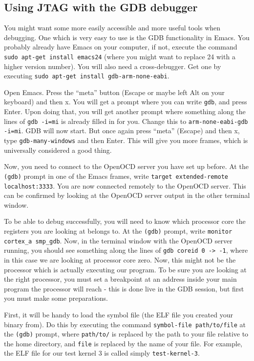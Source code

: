 \documentclass[a4paper,11pt,reqno]{amsart}
\begin{document}
{\subsection{Using JTAG with the GDB debugger}
You might want some more easily accessible and more useful tools when debugging. One which is very easy to use is the GDB functionality in Emacs. You probably already have Emacs on your computer, if not, execute the command \texttt{sudo apt-get install emacs24} (where you might want to replace 24 with a higher version number). You will also need a cross-debugger. Get one by executing \texttt{sudo apt-get install gdb-arm-none-eabi}.

Open Emacs. Press the ``meta'' button (Escape or maybe left Alt on your keyboard) and then x. You will get a prompt where you can write \texttt{gdb}, and press Enter. Upon doing that, you will get another prompt where something along the lines of \texttt{gdb -i=mi} is already filled in for you. Change this to \texttt{arm-none-eabi-gdb -i=mi}. GDB will now start. But once again press ``meta'' (Escape) and then x, type \texttt{gdb-many-windows} and then Enter. This will give you more frames, which is universally considered a good thing.

Now, you need to connect to the OpenOCD server you have set up before. At the \texttt{(gdb)} prompt in one of the Emacs frames, write \texttt{target extended-remote localhost:3333}. You are now connected remotely to the OpenOCD server. This can be confirmed by looking at the OpenOCD server output in the other terminal window.

To be able to debug successfully, you will need to know which processor core the registers you are looking at belongs to. At the \texttt{(gdb)} prompt, write \texttt{monitor cortex\_a smp\_gdb}. Now, in the terminal window with the OpenOCD server running, you should see something along the lines of \texttt{gdb coreid  0 -> -1}, where in this case we are looking at processor core zero. Now, this might not be the processor which is actually executing our program. To be sure you are looking at the right processor, you must set a breakpoint at an address inside your main program the processor will reach - this is done live in the GDB session, but first you must make some preparations.

First, it will be handy to load the symbol file (the ELF file you created your binary from). Do this by executing the command \texttt{symbol-file path/to/file} at the \texttt{(gdb)} prompt, where \texttt{path/to/} is replaced by the path to your file relative to the home directory, and \texttt{file} is replaced by the name of your file. For example, the ELF file for our test kernel 3 is called simply \texttt{test-kernel-3}. 

}
\end{document}
